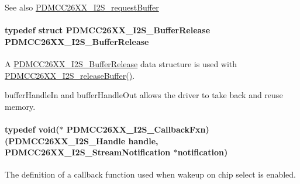 \begin{DoxySeeAlso}{See also}
\hyperlink{_p_d_m_c_c26_x_x__util_8h_a69561b9a6f07a82bfe3b18f3c51fcd19}{P\+D\+M\+C\+C26\+X\+X\+\_\+\+I2\+S\+\_\+request\+Buffer} 
\end{DoxySeeAlso}
\paragraph[{P\+D\+M\+C\+C26\+X\+X\+\_\+\+I2\+S\+\_\+\+Buffer\+Release}]{\setlength{\rightskip}{0pt plus 5cm}typedef struct {\bf P\+D\+M\+C\+C26\+X\+X\+\_\+\+I2\+S\+\_\+\+Buffer\+Release}  {\bf P\+D\+M\+C\+C26\+X\+X\+\_\+\+I2\+S\+\_\+\+Buffer\+Release}}\label{_p_d_m_c_c26_x_x__util_8h_ab2a6fc7ef5e6cf67ee2686e4d6553ea4}


A \hyperlink{struct_p_d_m_c_c26_x_x___i2_s___buffer_release}{P\+D\+M\+C\+C26\+X\+X\+\_\+\+I2\+S\+\_\+\+Buffer\+Release} data structure is used with \hyperlink{_p_d_m_c_c26_x_x__util_8h_ae6436840c3944258d3bdf041250dd10c}{P\+D\+M\+C\+C26\+X\+X\+\_\+\+I2\+S\+\_\+release\+Buffer()}. 

buffer\+Handle\+In and buffer\+Handle\+Out allows the driver to take back and reuse memory. 
\paragraph[{P\+D\+M\+C\+C26\+X\+X\+\_\+\+I2\+S\+\_\+\+Callback\+Fxn}]{\setlength{\rightskip}{0pt plus 5cm}typedef void($\ast$ P\+D\+M\+C\+C26\+X\+X\+\_\+\+I2\+S\+\_\+\+Callback\+Fxn) ({\bf P\+D\+M\+C\+C26\+X\+X\+\_\+\+I2\+S\+\_\+\+Handle} handle, {\bf P\+D\+M\+C\+C26\+X\+X\+\_\+\+I2\+S\+\_\+\+Stream\+Notification} $\ast$notification)}\label{_p_d_m_c_c26_x_x__util_8h_a82786f08d1b22895c79dcd8880fb92f3}


The definition of a callback function used when wakeup on chip select is enabled. 


